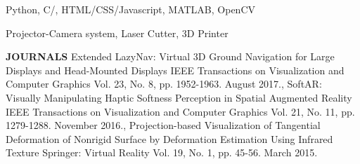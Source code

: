 \documentclass[11pt]{article} %
\begin{document}
{Python, C/\CPP, HTML/CSS/Javascript, MATLAB, OpenCV}

{Projector-Camera system, Laser Cutter, 3D Printer}

\pagebreak


\textbf{JOURNALS}
\publicationthelist
{
				{Extended LazyNav: Virtual 3D Ground Navigation for Large Displays and Head-Mounted Displays}
				{IEEE Transactions on Visualization and Computer Graphics}
				{Vol. 23, No. 8, pp. 1952-1963.}
				{August 2017.},
				{SoftAR: Visually Manipulating Haptic Softness Perception in Spatial Augmented Reality}
				{IEEE Transactions on Visualization and Computer Graphics}
				{Vol. 21, No. 11, pp. 1279-1288.}
				{November 2016.},
				{Projection-based Visualization of Tangential Deformation of Nonrigid Surface by Deformation Estimation Using Infrared Texture}
				{Springer: Virtual Reality}
				{Vol. 19, No. 1, pp. 45-56.}
				{March 2015.}
}
\end{document}
